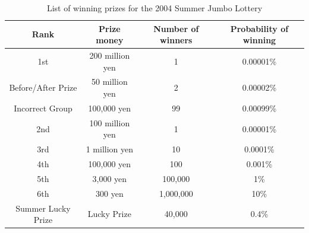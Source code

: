 \begin{table}[hb]
    \centering
    \caption{List of winning prizes for the 2004 Summer Jumbo Lottery}
    \begin{tabular}{cccc}
        Rank     & Prize money   & Number of winners      & Probability of winning      \\\hline
        1st     & 200 million yen   & 1       & 0.00001\% \\
        Before/After Prize    & 50 million yen  & 2       & 0.00002\% \\
        Incorrect Group    & 100,000 yen  & 99      & 0.00099\% \\
        2nd     & 100 million yen   & 1       & 0.00001\% \\
        3rd     & 1 million yen & 10      & 0.0001\%  \\
        4th     & 100,000 yen  & 100     & 0.001\%   \\
        5th     & 3,000 yen & 100,000  & 1\%       \\
        6th     & 300 yen  & 1,000,000 & 10\%      \\
        Summer Lucky Prize & Lucky Prize & 40,000   & 0.4\%     \\
    \end{tabular}
    \label{takarakuji}
\end{table}
